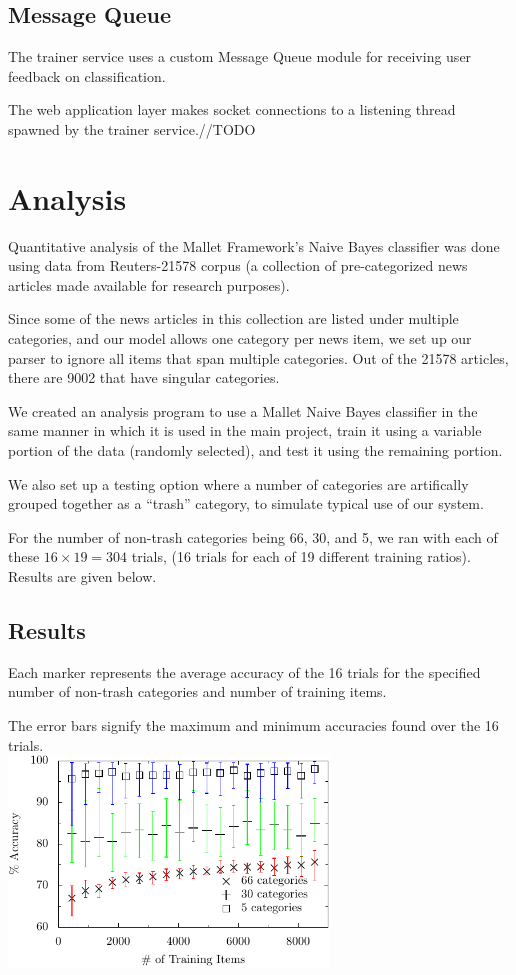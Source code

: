 \documentclass[letterpaper]{article}
\begin{document}
\subsection{Message Queue}
\label{MessageQueueSection}
The trainer service uses a custom Message Queue module for receiving user feedback on classification.

The web application layer makes socket connections to a listening thread spawned by the trainer service.//TODO

\section{Analysis}
Quantitative analysis of the Mallet Framework's Naive Bayes classifier was done using data from Reuters-21578 corpus \cite{Reuters21578} (a collection of pre-categorized news articles made available for research purposes).

Since some of the news articles in this collection are listed under multiple categories, and our model allows one category per news item, we set up our parser to ignore all items that span multiple categories. Out of the 21578 articles, there are 9002 that have singular categories.

We created an analysis program to use a Mallet Naive Bayes classifier in the same manner in which it is used in the main project, train it using a variable portion of the data (randomly selected), and test it using the remaining portion.

We also set up a testing option where a number of categories are artifically grouped together as a ``trash'' category, to simulate typical use of our system.

For the number of non-trash categories being 66, 30, and 5, we ran with each of these $16\times 19=304$ trials, (16 trials for each of 19 different training ratios). Results are given below.

\subsection{Results}
Each marker represents the average accuracy of the 16 trials for the specified number of non-trash categories and number of training items.

The error bars signify the maximum and minimum accuracies found over the 16 trials.\\

\noindent\includegraphics[width=3.35in]{data.pdf}
\end{document}
